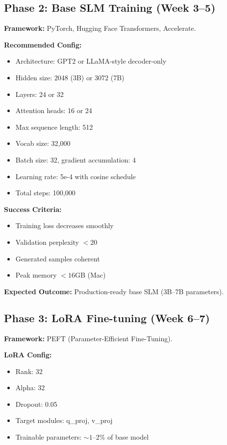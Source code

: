 \documentclass[11pt]{article}
\begin{document}
\subsection{Phase 2: Base SLM Training (Week 3--5)}

\textbf{Framework:} PyTorch, Hugging Face Transformers, Accelerate.

\textbf{Recommended Config:}
\begin{itemize}[leftmargin=1.2em]
  \item Architecture: GPT2 or LLaMA-style decoder-only
  \item Hidden size: 2048 (3B) or 3072 (7B)
  \item Layers: 24 or 32
  \item Attention heads: 16 or 24
  \item Max sequence length: 512
  \item Vocab size: 32,000
  \item Batch size: 32, gradient accumulation: 4
  \item Learning rate: 5e-4 with cosine schedule
  \item Total steps: 100,000
\end{itemize}

\textbf{Success Criteria:}
\begin{itemize}[leftmargin=1.2em]
  \item Training loss decreases smoothly
  \item Validation perplexity $< 20$
  \item Generated samples coherent
  \item Peak memory $< 16$GB (Mac)
\end{itemize}

\textbf{Expected Outcome:} Production-ready base SLM (3B--7B parameters).

\subsection{Phase 3: LoRA Fine-tuning (Week 6--7)}

\textbf{Framework:} PEFT (Parameter-Efficient Fine-Tuning).

\textbf{LoRA Config:}
\begin{itemize}[leftmargin=1.2em]
  \item Rank: 32
  \item Alpha: 32
  \item Dropout: 0.05
  \item Target modules: q\_proj, v\_proj
  \item Trainable parameters: $\sim 1$--2\% of base model
\end{itemize}
\end{document}
